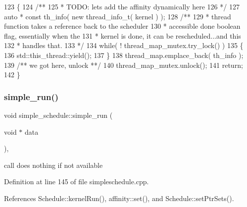 \begin{DoxyCode}
123 \{\textcolor{comment}{}
124 \textcolor{comment}{      /** }
125 \textcolor{comment}{       * TODO: lets add the affinity dynamically here}
126 \textcolor{comment}{       */}
127       \textcolor{keyword}{auto} * \textcolor{keyword}{const} th\_info( \textcolor{keyword}{new} thread\_info\_t( kernel ) );\textcolor{comment}{}
128 \textcolor{comment}{      /** }
129 \textcolor{comment}{       * thread function takes a reference back to the scheduler}
130 \textcolor{comment}{       * accessible done boolean flag, essentially when the }
131 \textcolor{comment}{       * kernel is done, it can be rescheduled...and this}
132 \textcolor{comment}{       * handles that.}
133 \textcolor{comment}{       */}
134       \textcolor{keywordflow}{while}( ! thread\_map\_mutex.try\_lock() )
135       \{
136          std::this\_thread::yield();
137       \}
138       thread\_map.emplace\_back( th\_info );\textcolor{comment}{}
139 \textcolor{comment}{      /** we got here, unlock **/}
140       thread\_map\_mutex.unlock();
141       \textcolor{keywordflow}{return};
142 \}
\end{DoxyCode}
\hypertarget{classsimple__schedule_a128caa6bacc62c7289bb09f234ef75b7}{}\label{classsimple__schedule_a128caa6bacc62c7289bb09f234ef75b7} 
\subsubsection{\texorpdfstring{simple\+\_\+run()}{simple\_run()}}
{\footnotesize\ttfamily void simple\+\_\+schedule\+::simple\+\_\+run (\begin{DoxyParamCaption}\item[{void $\ast$}]{data }\end{DoxyParamCaption})\hspace{0.3cm}{\ttfamily [static]}, {\ttfamily [protected]}}

call does nothing if not available 

Definition at line 145 of file simpleschedule.\+cpp.



References Schedule\+::kernel\+Run(), affinity\+::set(), and Schedule\+::set\+Ptr\+Sets().


